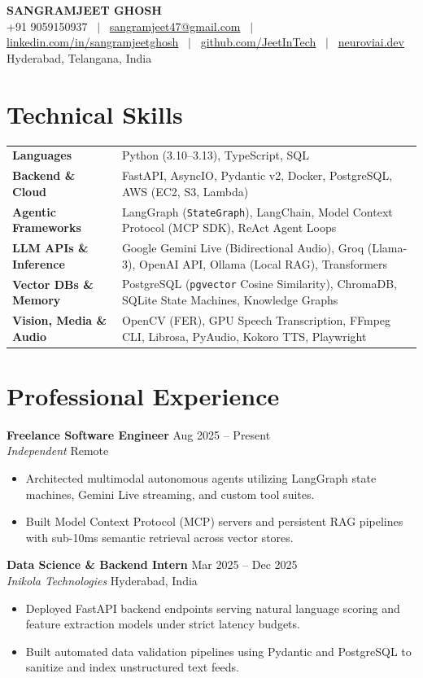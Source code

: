 \documentclass[10pt]{article}
\makeatletter
\newcommand{\resumeHeader}{
\begin{center}
{\LARGE \textbf{SANGRAMJEET GHOSH}} \\[3pt]
{\small
+91 9059150937 ~$|$~
\href{mailto:sangramjeet47@gmail.com}{sangramjeet47@gmail.com} ~$|$~
\href{https://www.linkedin.com/in/sangramjeetghosh}{linkedin.com/in/sangramjeetghosh} ~$|$~
\href{https://github.com/JeetInTech}{github.com/JeetInTech} ~$|$~
\href{https://neuroviai.dev}{neuroviai.dev}
}\\[1pt]
{\footnotesize Hyderabad, Telangana, India}
\end{center}
\vspace{-8pt}
}
\makeatother
\begin{document}
\resumeHeader

\section*{Technical Skills}
\begin{tabularx}{\textwidth}{@{}l X@{}}
\textbf{Languages} & Python (3.10--3.13), TypeScript, SQL \\[1.5pt]
\textbf{Backend \& Cloud} & FastAPI, AsyncIO, Pydantic v2, Docker, PostgreSQL, AWS (EC2, S3, Lambda) \\[1.5pt]
\textbf{Agentic Frameworks} & LangGraph (\texttt{StateGraph}), LangChain, Model Context Protocol (MCP SDK), ReAct Agent Loops \\[1.5pt]
\textbf{LLM APIs \& Inference} & Google Gemini Live (Bidirectional Audio), Groq (Llama-3), OpenAI API, Ollama (Local RAG), Transformers \\[1.5pt]
\textbf{Vector DBs \& Memory} & PostgreSQL (\texttt{pgvector} Cosine Similarity), ChromaDB, SQLite State Machines, Knowledge Graphs \\[1.5pt]
\textbf{Vision, Media \& Audio} & OpenCV (FER), GPU Speech Transcription, FFmpeg CLI, Librosa, PyAudio, Kokoro TTS, Playwright \\
\end{tabularx}

\section*{Professional Experience}
\textbf{Freelance Software Engineer} \hfill Aug 2025 -- Present \\
\textit{Independent} \hfill Remote
\begin{itemize}
    \item Architected multimodal autonomous agents utilizing LangGraph state machines, Gemini Live streaming, and custom tool suites.
    \item Built Model Context Protocol (MCP) servers and persistent RAG pipelines with sub-10ms semantic retrieval across vector stores.
\end{itemize}

\vspace{1.5pt}
\textbf{Data Science \& Backend Intern} \hfill Mar 2025 -- Dec 2025 \\
\textit{Inikola Technologies} \hfill Hyderabad, India
\begin{itemize}
    \item Deployed FastAPI backend endpoints serving natural language scoring and feature extraction models under strict latency budgets.
    \item Built automated data validation pipelines using Pydantic and PostgreSQL to sanitize and index unstructured text feeds.
\end{itemize}
\end{document}
